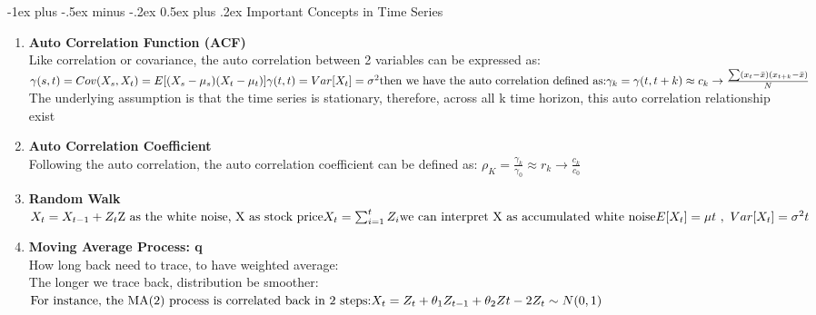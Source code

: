 \documentclass[10pt,landscape]{article}
\makeatletter
\renewcommand{\section}{\@startsection{section}{1}{0mm}%
                                {-1ex plus -.5ex minus -.2ex}%
                                {0.5ex plus .2ex}%
                                {\normalfont\large\bfseries}}
\makeatother
\begin{document}
\newpage
\begin{multicols}{3}
\setlength{\premulticols}{1pt}
\setlength{\postmulticols}{1pt}
\setlength{\multicolsep}{1pt}
\setlength{\columnsep}{2pt}



\section{Important Concepts in Time Series}
\begin{enumerate}
  \item \textbf{Auto Correlation Function (ACF)}\\
  		Like correlation or covariance, the auto correlation between 2 variables can be expressed as:\\
  		$
  		\gamma(s,t) = Cov(X_s, X_t) = E[(X_s - \mu_s)(X_t-\mu_t)]\\
  		\gamma(t,t) = Var[X_t] = \sigma^2\\
  		\text{then we have the auto correlation defined as:}\\
  		\gamma_k = \gamma(t, t+k) \approx c_k \rightarrow \frac{\sum(x_t - \bar x)(x_{t+k}-\bar x)}{N} \\
  		\text{}
  		$The underlying assumption is that the time series is stationary, therefore, across all k time horizon, this auto correlation relationship exist
  \item \textbf{Auto Correlation Coefficient}\\
  		Following the auto correlation, the auto correlation coefficient can be defined as:
  		$
  		\rho_K = \frac{\gamma_k}{\gamma_0} \approx r_k \rightarrow \frac{c_k}{c_0}
  		$
  \item \textbf{Random Walk}\\
  		$
  		X_t = X_{t-1}+Z_t\\
  		\text{Z as the white noise, X as stock price}\\
  		X_t = \sum_{i=1}^t Z_i\\
  		\text{we can interpret X as accumulated white noise}\\
  		E[X_t] = \mu t \ , \ Var[X_t] = \sigma^2 t
  		$
  \item \textbf{Moving Average Process: q}\\
  		How long back need to trace, to have weighted average:\\
  		The longer we trace back, distribution be smoother:\\
  		$
  		\text{For instance, the MA(2) process is correlated back in 2 steps:}\\
  		X_t = Z_t + \theta_1 Z_{t-1} + \theta_2 Z{t-2}\\
  		Z_t \sim N(0,1)
  		$
  		

\end{enumerate}
\end{multicols}
\end{document}
